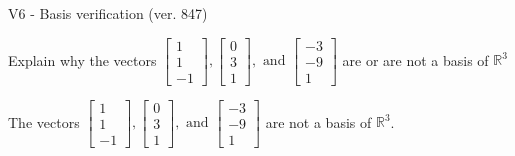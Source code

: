 \begin{exercise}
  \begin{exerciseTitle}V6 - Basis verification (ver. 847)\end{exerciseTitle}
  \begin{exerciseStatement}
    Explain why the vectors \(\left[\begin{array}{r}
1 \\
1 \\
-1
\end{array}\right] , \left[\begin{array}{r}
0 \\
3 \\
1
\end{array}\right] , \text{ and } \left[\begin{array}{r}
-3 \\
-9 \\
1
\end{array}\right]\) are or are not a basis of \(\mathbb{R}^3\)	


  \end{exerciseStatement}
  \begin{exerciseAnswer}
   The vectors \(\left[\begin{array}{r}
1 \\
1 \\
-1
\end{array}\right] , \left[\begin{array}{r}
0 \\
3 \\
1
\end{array}\right] , \text{ and } \left[\begin{array}{r}
-3 \\
-9 \\
1
\end{array}\right]\) 
  	 are not  a basis of \(\mathbb{R}^3\).
  


  \end{exerciseAnswer}
\end{exercise}